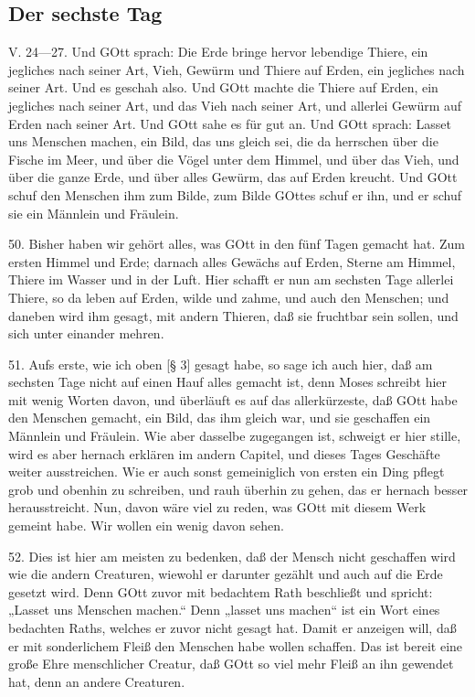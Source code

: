 \subsection{Der sechste Tag}

\begin{schriftzitat}
V. 24—27. Und GOtt sprach: Die Erde bringe hervor lebendige Thiere, ein jegliches nach seiner Art, Vieh, Gewürm und Thiere auf Erden, ein jegliches nach seiner Art. Und es geschah also. Und GOtt machte die Thiere auf Erden, ein jegliches nach seiner Art, und das Vieh nach seiner Art, und allerlei Gewürm auf Erden nach seiner Art. Und GOtt sahe es für gut an. Und GOtt sprach: Lasset uns Menschen machen, ein Bild, das uns gleich sei, die da herrschen über die Fische im Meer, und über die Vögel unter dem Himmel, und über das Vieh, und über die ganze Erde, und über alles Gewürm, das auf Erden kreucht. Und GOtt schuf den Menschen ihm zum Bilde, zum Bilde GOttes schuf er ihn, und er schuf sie ein Männlein und Fräulein.
\end{schriftzitat}

50. Bisher haben wir gehört alles, was GOtt in den fünf Tagen gemacht hat. Zum ersten Himmel und Erde; darnach alles Gewächs auf Erden, Sterne am Himmel, Thiere im Wasser und in der Luft. Hier schafft er nun am sechsten Tage allerlei Thiere, so da leben auf Erden, wilde und zahme, und auch den Menschen; und daneben wird ihm gesagt, mit andern Thieren, daß sie fruchtbar sein sollen, und sich unter einander mehren.

51. Aufs erste, wie ich oben [§ 3] gesagt habe, so sage ich auch hier, daß am sechsten Tage nicht auf einen Hauf alles gemacht ist, denn Moses schreibt hier mit wenig Worten davon, und überläuft es auf das allerkürzeste, daß GOtt habe den Menschen gemacht, ein Bild, das ihm gleich war, und sie geschaffen ein Männlein und Fräulein. Wie aber dasselbe zugegangen ist, schweigt er hier stille, wird es aber hernach erklären im andern Capitel, und dieses Tages Geschäfte weiter ausstreichen. Wie er auch sonst gemeiniglich von ersten ein Ding pflegt grob und obenhin zu schreiben, und rauh überhin zu gehen, das er hernach besser herausstreicht. Nun, davon wäre viel zu reden, was GOtt mit diesem Werk gemeint habe. Wir wollen ein wenig davon sehen.

52. Dies ist hier am meisten zu bedenken, daß der Mensch nicht geschaffen wird wie die andern Creaturen, wiewohl er darunter gezählt und auch auf die Erde gesetzt wird. Denn GOtt zuvor mit bedachtem Rath beschließt und spricht: „Lasset uns Menschen machen.“ Denn „lasset uns machen“ ist ein Wort eines bedachten Raths, welches er zuvor nicht gesagt hat. Damit er anzeigen will, daß er mit sonderlichem Fleiß den Menschen habe wollen schaffen. Das ist bereit eine große Ehre menschlicher Creatur, daß GOtt so viel mehr Fleiß an ihn gewendet hat, denn an andere Creaturen.

